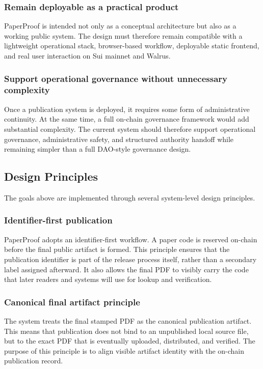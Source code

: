 \documentclass[journal]{IEEEtran}
\begin{document}
\subsubsection{Remain deployable as a practical product}

PaperProof is intended not only as a conceptual architecture but also as a working public system. The design must therefore remain compatible with a lightweight operational stack, browser-based workflow, deployable static frontend, and real user interaction on Sui mainnet and Walrus.

\subsubsection{Support operational governance without unnecessary complexity}

Once a publication system is deployed, it requires some form of administrative continuity. At the same time, a full on-chain governance framework would add substantial complexity. The current system should therefore support operational governance, administrative safety, and structured authority handoff while remaining simpler than a full DAO-style governance design.

\subsection{Design Principles}

The goals above are implemented through several system-level design principles.

\subsubsection{Identifier-first publication}

PaperProof adopts an identifier-first workflow. A paper code is reserved on-chain before the final public artifact is formed. This principle ensures that the publication identifier is part of the release process itself, rather than a secondary label assigned afterward. It also allows the final PDF to visibly carry the code that later readers and systems will use for lookup and verification.

\subsubsection{Canonical final artifact principle}

The system treats the final stamped PDF as the canonical publication artifact. This means that publication does not bind to an unpublished local source file, but to the exact PDF that is eventually uploaded, distributed, and verified. The purpose of this principle is to align visible artifact identity with the on-chain publication record.
\end{document}
